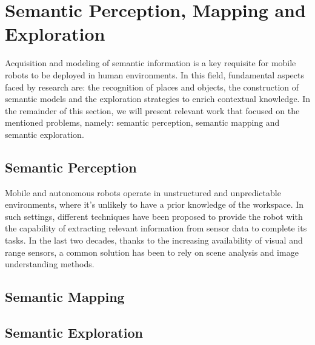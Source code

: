 \documentclass{article}
\begin{document}
	
	\section*{Semantic Perception, Mapping and Exploration}
	
	Acquisition and modeling of semantic information is a key requisite for mobile robots to be deployed in human environments. In this field, fundamental aspects faced by research are: the recognition of places and objects, the construction of semantic models and the exploration strategies to enrich contextual knowledge. In the remainder of this section, we will present relevant work that focused on the mentioned problems, namely: semantic perception, semantic mapping and semantic exploration.
	
	\subsection*{Semantic Perception}
	
	Mobile and autonomous robots operate in unstructured and unpredictable environments, where it's unlikely to have a prior knowledge of the workspace. In such settings, different techniques have been proposed to provide the robot with	the capability of extracting relevant information from sensor data to complete its tasks. In the last two decades, thanks to the increasing availability of visual and range sensors, a common solution has been to rely on scene analysis and image understanding methods.
	\subsection*{Semantic Mapping}
	
	\subsection*{Semantic Exploration}
	
	
\end{document}

